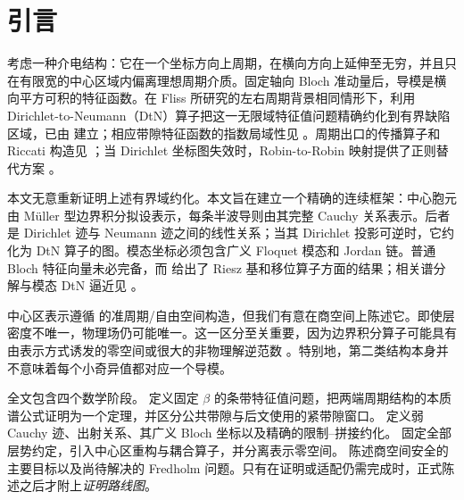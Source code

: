 \section{引言}

考虑一种介电结构：它在一个坐标方向上周期，在横向方向上延伸至无穷，并且只在有限宽的中心区域内偏离理想周期介质。固定轴向 Bloch 准动量后，导模是横向平方可积的特征函数。在 Fliss 所研究的左右周期背景相同情形下，利用 Dirichlet-to-Neumann（DtN）算子把这一无限域特征值问题精确约化到有界缺陷区域，已由 \cite[Theorem~4.5]{Fliss2013} 建立；相应带隙特征函数的指数局域性见 \cite[Theorem~3.5]{Fliss2013}。周期出口的传播算子和 Riccati 构造见 \cite{JolyLiFliss2006,Coatleven2012}；当 Dirichlet 坐标图失效时，Robin-to-Robin 映射提供了正则替代方案 \cite{FlissKlindworthSchmidt2015}。

本文无意重新证明上述有界域约化。本文旨在建立一个精确的连续框架：中心胞元由 M\"uller 型边界积分拟设表示，每条半波导则由其完整 Cauchy 关系表示。后者是 Dirichlet 迹与 Neumann 迹之间的线性关系；当其 Dirichlet 投影可逆时，它约化为 DtN 算子的图。模态坐标必须包含广义 Floquet 模态和 Jordan 链。普通 Bloch 特征向量未必完备，而 \cite[Theorem~2.2]{HohageSoussi2013} 给出了 Riesz 基和移位算子方面的结果；相关谱分解与模态 DtN 逼近见 \cite{Zhang2021,Zhang2023}。

中心区表示遵循 \cite[Theorem~4 and Appendix~A]{BarnettGreengard2010} 的准周期/自由空间构造，但我们有意在商空间上陈述它。即使层密度不唯一，物理场仍可能唯一。这一区分至关重要，因为边界积分算子可能具有由表示方式诱发的零空间或很大的非物理解逆范数 \cite{HiptmairMoiolaSpence2022}。特别地，第二类结构本身并不意味着每个小奇异值都对应一个导模。

全文包含四个数学阶段。 定义固定 $\beta$ 的条带特征值问题，把两端周期结构的本质谱公式证明为一个定理，并区分公共带隙与后文使用的紧带隙窗口。 定义弱 Cauchy 迹、出射关系、其广义 Bloch 坐标以及精确的限制--拼接约化。 固定全部层势约定，引入中心区重构与耦合算子，并分离表示零空间。 陈述商空间安全的主要目标以及尚待解决的 Fredholm 问题。只有在证明或适配仍需完成时，正式陈述之后才附上\emph{证明路线图}。

